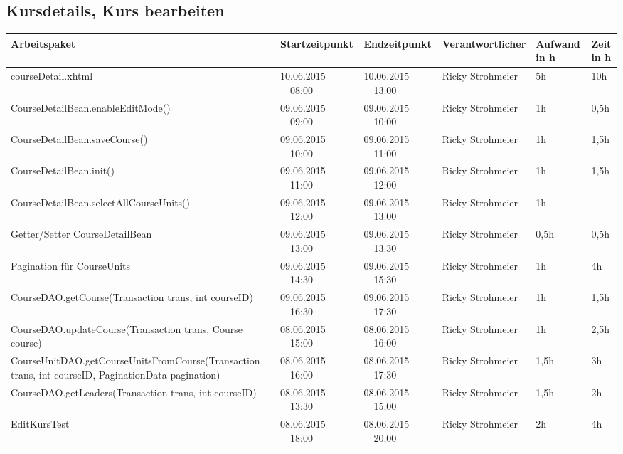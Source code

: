 \begin{landscape}
\subsection{Kursdetails, Kurs bearbeiten}
\begin{tabular}{|p{10.3cm}|p{3.2cm}|p{3.2cm}|p{3.5cm}|p{1.7cm}|p{1.5cm}|}
	\hline  \textbf{Arbeitspaket} & \textbf{Startzeitpunkt} & \textbf{Endzeitpunkt} & \textbf{Verantwortlicher}  & \textbf{Aufwand in h} & \textbf{Zeit in h}\\ 
	\hline   courseDetail.xhtml                                         & 10.06.2015 \ \ 08:00       & 10.06.2015  \ \  13:00     & Ricky Strohmeier  &  5h     & 10h \\
	\hline   CourseDetailBean.enableEditMode()                          & 09.06.2015 \ \ 09:00       & 09.06.2015  \ \  10:00     & Ricky Strohmeier  &  1h     & 0,5h\\
	\hline   CourseDetailBean.saveCourse()                              & 09.06.2015 \ \ 10:00       & 09.06.2015  \ \  11:00     & Ricky Strohmeier  &  1h     & 1,5h\\
	\hline   CourseDetailBean.init()                                    & 09.06.2015 \ \ 11:00       & 09.06.2015  \ \  12:00     & Ricky Strohmeier  &  1h     & 1,5h\\
	\hline   CourseDetailBean.selectAllCourseUnits()                    & 09.06.2015 \ \ 12:00       & 09.06.2015  \ \  13:00     & Ricky Strohmeier  &  1h     &     \\
	\hline   Getter/Setter CourseDetailBean                             & 09.06.2015 \ \ 13:00       & 09.06.2015  \ \  13:30     & Ricky Strohmeier  &  0,5h   & 0,5h\\
	\hline   Pagination für CourseUnits                                 & 09.06.2015 \ \ 14:30       & 09.06.2015  \ \  15:30     & Ricky Strohmeier  &  1h     &  4h \\
	\hline   CourseDAO.getCourse(Transaction trans, int courseID)       & 09.06.2015 \ \ 16:30       & 09.06.2015  \ \  17:30     & Ricky Strohmeier  &  1h     & 1,5h\\
	\hline   CourseDAO.updateCourse(Transaction trans, Course course)   & 08.06.2015 \ \ 15:00       & 08.06.2015  \ \  16:00     & Ricky Strohmeier  &  1h     & 2,5h\\
	\hline   CourseUnitDAO.getCourseUnitsFromCourse(Transaction trans, int courseID, PaginationData pagination) & 08.06.2015 \ \ 16:00       & 08.06.2015  \ \  17:30     & Ricky Strohmeier &  1,5h   &  3h \\
	\hline   CourseDAO.getLeaders(Transaction trans, int courseID)    & 08.06.2015 \ \ 13:30       & 08.06.2015  \ \  15:00     & Ricky Strohmeier  &  1,5h    & 2h\\
	\hline   EditKursTest    & 08.06.2015 \ \ 18:00       & 08.06.2015  \ \  20:00     & Ricky Strohmeier  &  2h    & 4h\\
	\hline 
\end{tabular} \ \\
\ \\
	

\end{landscape}
